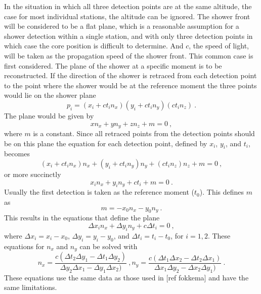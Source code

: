 In the situation in which all three detection points are at the same altitude, the case for most individual stations, the altitude can be ignored. The shower front will be considered to be a flat plane, which is a reasonable assumption for a shower detection within a single station, and with only three detection points in which case the core position is difficult to determine. And $c$, the speed of light, will be taken as the propagation speed of the shower front. This common case is first considered. The plane of the shower at a specific moment is to be reconstructed. If the direction of the shower is retraced from each detection point to the point where the shower would be at the reference moment the three points would lie on the shower plane
%
\begin{equation}
    p_i = (x_i + c t_i n_x) (y_i + c t_i n_y) (c t_i n_z) \ .
\end{equation}
%
The plane would be given by
%
\begin{equation}
    x n_x + y n_y + z n_z + m = 0 \ ,
\end{equation}
%
where $m$ is a constant. Since all retraced points from the detection points should be on this plane the equation for each detection point, defined by $x_i$, $y_i$, and $t_i$, becomes
%
\begin{equation}
    (x_i + c t_i n_x) n_x + (y_i + c t_i n_y) n_y + (c t_i n_z) n_z + m = 0 \ ,
\end{equation}
%
or more succinctly
%
\begin{equation}
    x_i n_x + y_i n_y + c t_i + m = 0 \ .
\end{equation}
%
Usually the first detection is taken as the reference moment ($t_0$). This defines $m$ as
%
\begin{equation}
    m = - x_0 n_x - y_0 n_y \ .
\end{equation}
%
This results in the equations that define the plane
%
\begin{equation}
    \Delta x_i n_x + \Delta y_i n_y + c \Delta t_i = 0 \ ,
\end{equation}
%
where $\Delta x_i = x_i - x_0$, $\Delta y_i = y_i - y_0$, and $\Delta t_i = t_i - t_0$, for $i = 1,2$.
%
These equations for $n_x$ and $n_y$ can be solved with
%
\begin{equation}
    n_x = \frac{c (\Delta t_2 \Delta y_1 - \Delta t_1 \Delta y_2)}
     		   {\Delta y_2 \Delta x_1 - \Delta y_1 \Delta x_2)} \ ,
    n_y = \frac{c (\Delta t_1 \Delta x_2 - \Delta t_2 \Delta x_1)}
     		   {\Delta x_1 \Delta y_2 - \Delta x_2 \Delta y_1)} \ .
\end{equation}
%
These equations use the same data as those used in [ref fokkema] and have the same limitations.



